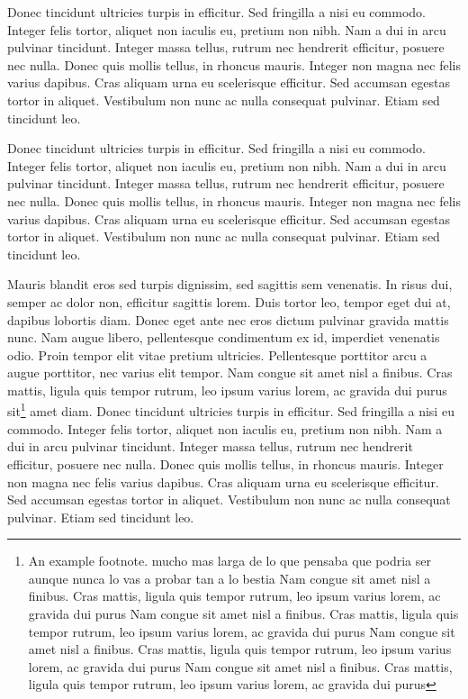 Donec tincidunt ultricies turpis in efficitur. Sed fringilla a nisi eu commodo. Integer felis tortor, aliquet non iaculis eu, pretium non nibh. Nam a dui in arcu pulvinar tincidunt. Integer massa tellus, rutrum nec hendrerit efficitur, posuere nec nulla. Donec quis mollis tellus, in rhoncus mauris. Integer non magna nec felis varius dapibus. Cras aliquam urna eu scelerisque efficitur. Sed accumsan egestas tortor in aliquet. Vestibulum non nunc ac nulla consequat pulvinar. Etiam sed tincidunt leo.

Donec tincidunt ultricies turpis in efficitur. Sed fringilla a nisi eu commodo. Integer felis tortor, aliquet non iaculis eu, pretium non nibh. Nam a dui in arcu pulvinar tincidunt. Integer massa tellus, rutrum nec hendrerit efficitur, posuere nec nulla. Donec quis mollis tellus, in rhoncus mauris. Integer non magna nec felis varius dapibus. Cras aliquam urna eu scelerisque efficitur. Sed accumsan egestas tortor in aliquet. Vestibulum non nunc ac nulla consequat pulvinar. Etiam sed tincidunt leo.

Mauris blandit eros sed turpis dignissim, sed sagittis sem venenatis. In risus dui, semper ac dolor non, efficitur sagittis lorem. Duis tortor leo, tempor eget dui at, dapibus lobortis diam. Donec eget ante nec eros dictum pulvinar gravida mattis nunc. Nam augue libero, pellentesque condimentum ex id, imperdiet venenatis odio. Proin tempor elit vitae pretium ultricies. Pellentesque porttitor arcu a augue porttitor, nec varius elit tempor. Nam congue sit amet nisl a finibus. Cras mattis, ligula quis tempor rutrum, leo ipsum varius lorem, ac gravida dui purus sit\footnote{An example footnote. mucho mas larga de lo que pensaba que podria ser aunque nunca lo vas a probar tan a lo bestia Nam congue sit amet nisl a finibus. Cras mattis, ligula quis tempor rutrum, leo ipsum varius lorem, ac gravida dui purus Nam congue sit amet nisl a finibus. Cras mattis, ligula quis tempor rutrum, leo ipsum varius lorem, ac gravida dui purus Nam congue sit amet nisl a finibus. Cras mattis, ligula quis tempor rutrum, leo ipsum varius lorem, ac gravida dui purus Nam congue sit amet nisl a finibus. Cras mattis, ligula quis tempor rutrum, leo ipsum varius lorem, ac gravida dui purus } amet diam.
Donec tincidunt ultricies turpis in efficitur. Sed fringilla a nisi eu commodo. Integer felis tortor, aliquet non iaculis eu, pretium non nibh. Nam a dui in arcu pulvinar tincidunt. Integer massa tellus, rutrum nec hendrerit efficitur, posuere nec nulla. Donec quis mollis tellus, in rhoncus mauris. Integer non magna nec felis varius dapibus. Cras aliquam urna eu scelerisque efficitur. Sed accumsan egestas tortor in aliquet. Vestibulum non nunc ac nulla consequat pulvinar. Etiam sed tincidunt leo.

